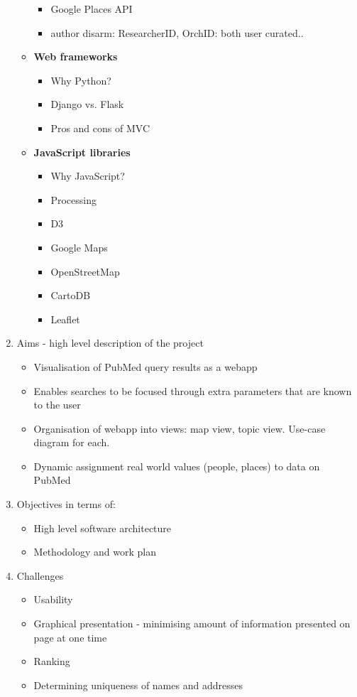 \documentclass[a4paper,12pt]{article}
\begin{document}
\begin{enumerate}
\begin{itemize}
\begin{itemize}
			\item Google Places API
			\item author disarm: ResearcherID, OrchID: both user curated..
		\end{itemize}
		\item \textbf{Web frameworks}
		\begin{itemize}
			\item Why Python?
			\item Django vs. Flask
			\item Pros and cons of MVC
		\end{itemize}
		\item \textbf{JavaScript libraries}
		\begin{itemize}
			\item Why JavaScript?
			\item Processing
			\item D3
			\item Google Maps
			\item OpenStreetMap
			\item CartoDB
			\item Leaflet
		\end{itemize}
	\end{itemize}
	\item Aims - high level description of the project
	\begin{itemize}
		\item Visualisation of PubMed query results as a webapp
		\item Enables searches to be focused through extra parameters that are known to the user
		\item Organisation of webapp into views: map view, topic view. Use-case diagram for each.
		\item Dynamic assignment real world values (people, places) to data on PubMed
	\end{itemize}
	\item Objectives in terms of:
	\begin{itemize}
		\item High level software architecture
		\item Methodology and work plan
	\end{itemize}
	\item Challenges
	\begin{itemize}
		\item Usability
		\item Graphical presentation - minimising amount of information presented on page at one time
		\item Ranking
		\item Determining uniqueness of names and addresses
	\end{itemize}
\end{enumerate}
\clearpage
\end{document}
